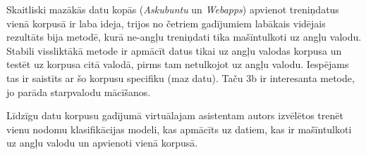 Skaitliski mazākās datu kopās (\textit{Askubuntu} un \textit{Webapps}) apvienot treniņdatus vienā korpusā ir laba ideja, trijos no četriem gadījumiem labākais vidējais rezultāts bija metodē, kurā ne-angļu treniņdati tika mašīntulkoti uz angļu valodu. Stabili vissliktākā metode ir apmācīt datus tikai uz angļu valodas korpusa un testēt uz korpusa citā valodā, pirms tam netulkojot uz angļu valodu. Iespējams tas ir saistīts ar šo korpusu specifiku (maz datu). Taču 3b ir interesanta metode, jo parāda starpvalodu mācīšanos. 

Līdzīgu datu korpusu gadījumā virtuālajam asistentam autors izvēlētos trenēt vienu nodomu klasifikācijas modeli, kas apmācīts uz datiem, kas ir mašīntulkoti uz angļu valodu un apvienoti vienā korpusā.









